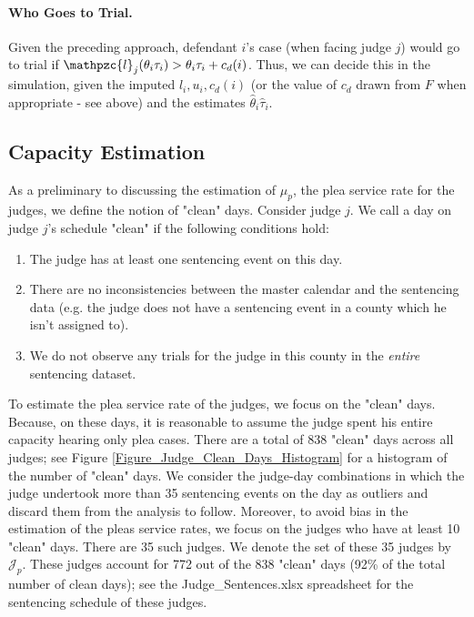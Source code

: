 \documentclass[11pt, oneside]{article}   	%
\theoremstyle{ModifiedStyle}
\begin{document}
		\paragraph{Who Goes to Trial.} Given the preceding approach, defendant $i$'s case (when facing judge $j$) would go to trial if $\mathpzc{l}_j(\theta_i\tau_i) > \theta_i\tau_i + c_d(i)$. Thus, we can decide this in the simulation, given the imputed $l_i,u_i,c_d(i)$ (or the value of $c_d$ drawn from $F$ when appropriate - see above) and the estimates $\hat{\theta}_i\hat{\tau}_i$.

	\subsection{Capacity Estimation}
		\label{Sec:Capacity_Estimation}

		As a preliminary to discussing the estimation of $\mu_p$, the plea service rate for the judges, we define the notion of "clean" days. Consider judge $j$. We call a day on judge $j$'s schedule "clean" if the following conditions hold:
		\begin{enumerate}[label=(\roman*)]
			\vspace{-2mm}
			\item The judge has at least one sentencing event on this day.
			\item There are no inconsistencies between the master calendar and the sentencing data (e.g. the judge does not have a sentencing event in a county which he isn't assigned to).
			\item We do not observe any trials for the judge in this county in the \emph{entire} sentencing dataset.
		\end{enumerate}
		\vspace{-1mm}
		To estimate the plea service rate of the judges, we focus on the "clean" days. Because, on these days, it is reasonable to assume the judge spent his entire capacity hearing only plea cases. There are a total of $838$ "clean" days across all judges; see Figure \ref{Figure_Judge_Clean_Days_Histogram} for a histogram of the number of "clean" days. We consider the judge-day combinations in which the judge undertook more than 35 sentencing events on the day as outliers and discard them from the analysis to follow. Moreover, to avoid bias in the estimation of the pleas service rates, we focus on the judges who have at least 10 "clean" days. There are 35 such judges. We denote the set of these 35 judges by $\mathcal{J}_p$. These judges account for 772 out of the 838 "clean" days (92\% of the total number of clean days); see the Judge\_Sentences.xlsx spreadsheet for the sentencing schedule of these judges.
\end{document}
